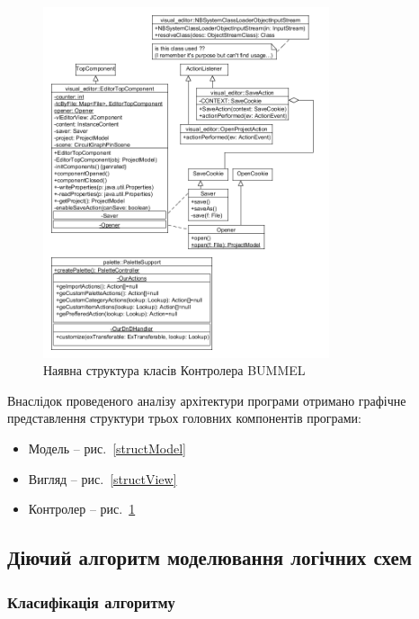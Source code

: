 \documentclass[12pt,a4paper]{article}
\begin{document}
\begin{figure}[h]
  \centering
    \includegraphics[width=0.75\textwidth]{class-diagram-controller.png}
  \caption{Наявна структура класів Контролера BUMMEL\label{structController}}
\end{figure}

Внаслідок проведеного аналізу архітектури програми отримано графічне представлення структури трьох головних компонентів програми:
\begin{itemize}
  \item Модель -- рис.~\ref{structModel}
  \item Вигляд -- рис.~\ref{structView}
  \item Контролер -- рис.~\ref{structController}
\end{itemize}

\subsection{Діючий алгоритм моделювання логічних схем}


\subsubsection{Класифікація алгоритму}
\end{document}
